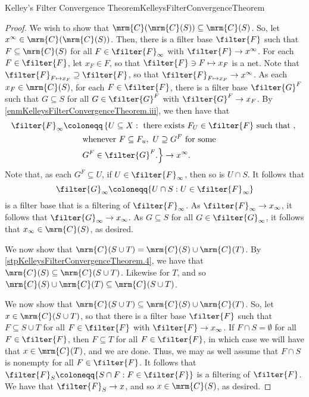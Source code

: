 \begin{thm}{Kelley's Filter Convergence Theorem}{KelleysFilterConvergenceTheorem}
\begin{proof}
We wish to show that $\mrm{C}(\mrm{C}(S))\subseteq \mrm{C}(S)$.  So, let $x^{\infty}\in \mrm{C}(\mrm{C}(S))$.  Then, there is a filter base $\filter{F}$ such that $F\subseteq \mrm{C}(S)$ for all $F\in \filter{F}_{\infty}$ with $\filter{F}\to x^{\infty}$.  For each $F\in \filter{F}$, let $x_F\in F$, so that $\filter{F}\ni F\mapsto x_F$ is a net.  Note that $\filter{F}_{F\mapsto x_F}\supseteq \filter{F}$, so that $\filter{F}_{F\mapsto x_F}\to x^{\infty}$.  As each $x_F\in \mrm{C}(S)$, for each $F\in \filter{F}$, there is a filter base $\filter{G}^F$ such that $G\subseteq S$ for all $G\in \filter{G}^F$ with $\filter{G}^F\to x_F$.  By \cref{enmKelleysFilterConvergenceTheorem.iii}, we then have that
\begin{equation}
\begin{split}
\filter{F}_{\infty} & \coloneqq \left\{ U\subseteq X:\text{ there exists }F_U\in \filter{F}\text{ such that },\right. \\
& \qquad \left. \text{whenever }F\subseteq F_u,\ U\supseteq G^F\text{ for some}\right. \\ & \qquad \left. G^F\in \filter{G}^F\text{.}\right\} \to x^{\infty}.
\end{split}
\end{equation}
Note that, as each $G^F\subseteq U$, if $U\in \filter{F}_{\infty}$, then so is $U\cap S$.  It follows that
\begin{equation}
\filter{G}_{\infty}\coloneqq \{ U\cap S:U\in \filter{F}_{\infty}\}
\end{equation}
is a filter base that is a filtering of $\filter{F}_{\infty}$.  As $\filter{F}_{\infty}\to x_{\infty}$, it follows that $\filter{G}_{\infty}\to x_{\infty}$.  As $G\subseteq S$ for all $G\in \filter{G}_{\infty}$, it follows that $x_{\infty}\in \mrm{C}(S)$, as desired.

We now show that $\mrm{C}(S\cup T)=\mrm{C}(S)\cup \mrm{C}(T)$.  By \cref{stpKelleysFilterConvergenceTheorem.4}, we have that $\mrm{C}(S)\subseteq \mrm{C}(S\cup T)$.  Likewise for $T$, and so $\mrm{C}(S)\cup \mrm{C}(T)\subseteq \mrm{C}(S\cup T)$.

We now show that $\mrm{C}(S\cup T)\subseteq \mrm{C}(S)\cup \mrm{C}(T)$.  So, let $x\in \mrm{C}(S\cup T)$, so that there is a filter base $\filter{F}$ such that $F\subseteq S\cup T$ for all $F\in \filter{F}$ with $\filter{F}\to x_{\infty}$.  If $F\cap S=\emptyset$ for all $F\in \filter{F}$, then $F\subseteq T$ for all $F\in \filter{F}$, in which case we will have that $x\in \mrm{C}(T)$, and we are done.  Thus, we may as well assume that $F\cap S$ is nonempty for all $F\in \filter{F}$.  It follows that $\filter{F}_S\coloneqq \{ S\cap F:F\in \filter{F}\}$ is a filtering of $\filter{F}$.  We have that $\filter{F}_S\to x$, and so $x\in \mrm{C}(S)$, as desired.


\end{proof}
\end{thm}
